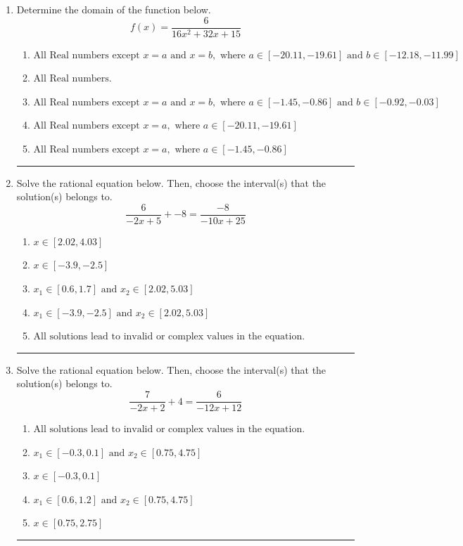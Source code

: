 \documentclass[14pt]{extbook}
\newcommand{\litem}[1]{\item#1\hspace*{-1cm}\rule{\textwidth}{0.4pt}}
\begin{document}
\begin{enumerate}
\litem{
Determine the domain of the function below.\[ f(x) = \frac{6}{16x^{2} +32 x + 15} \]\begin{enumerate}[label=\Alph*.]
\item \( \text{All Real numbers except } x = a \text{ and } x = b, \text{ where } a \in [-20.11, -19.61] \text{ and } b \in [-12.18, -11.99] \)
\item \( \text{All Real numbers.} \)
\item \( \text{All Real numbers except } x = a \text{ and } x = b, \text{ where } a \in [-1.45, -0.86] \text{ and } b \in [-0.92, -0.03] \)
\item \( \text{All Real numbers except } x = a, \text{ where } a \in [-20.11, -19.61] \)
\item \( \text{All Real numbers except } x = a, \text{ where } a \in [-1.45, -0.86] \)

\end{enumerate} }
\litem{
Solve the rational equation below. Then, choose the interval(s) that the solution(s) belongs to.\[ \frac{6}{-2x + 5} + -8 = \frac{-8}{-10x + 25} \]\begin{enumerate}[label=\Alph*.]
\item \( x \in [2.02,4.03] \)
\item \( x \in [-3.9,-2.5] \)
\item \( x_1 \in [0.6, 1.7] \text{ and } x_2 \in [2.02,5.03] \)
\item \( x_1 \in [-3.9, -2.5] \text{ and } x_2 \in [2.02,5.03] \)
\item \( \text{All solutions lead to invalid or complex values in the equation.} \)

\end{enumerate} }
\litem{
Solve the rational equation below. Then, choose the interval(s) that the solution(s) belongs to.\[ \frac{7}{-2x + 2} + 4 = \frac{6}{-12x + 12} \]\begin{enumerate}[label=\Alph*.]
\item \( \text{All solutions lead to invalid or complex values in the equation.} \)
\item \( x_1 \in [-0.3, 0.1] \text{ and } x_2 \in [0.75,4.75] \)
\item \( x \in [-0.3,0.1] \)
\item \( x_1 \in [0.6, 1.2] \text{ and } x_2 \in [0.75,4.75] \)
\item \( x \in [0.75,2.75] \)


\end{enumerate}}
\end{enumerate}
\end{document}
